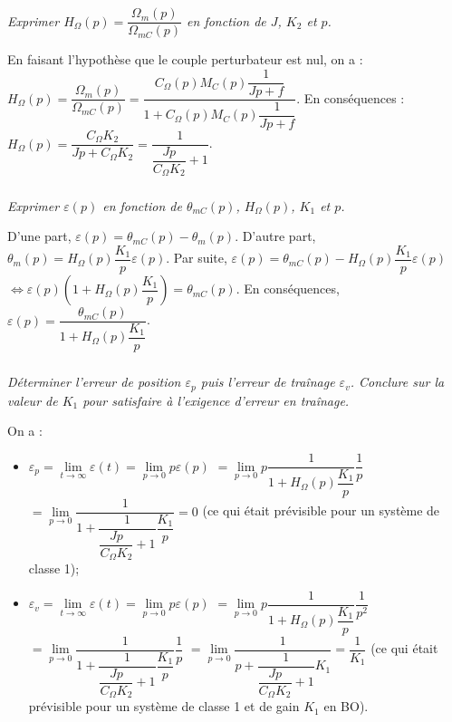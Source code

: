 \documentclass[10pt,fleqn]{article} %
\begin{document}
\begin{multicols}{2}
\else
\fi


\subparagraph{}\textit{Exprimer $H_{\Omega}(p)=\dfrac{\Omega_m(p)}{\Omega_{mC}(p)}$
en fonction de $J$, $K_2$ et $p$.}
\ifprof
\begin{corrige}
En faisant l'hypothèse que le couple perturbateur est nul, on a :
$H_{\Omega}(p)=\dfrac{\Omega_m(p)}{\Omega_{mC}(p)}=\dfrac{C_{\Omega}(p)M_C(p)\dfrac{1}{Jp+f}}{1+C_{\Omega}(p)M_C(p)\dfrac{1}{Jp+f}}$. En conséquences : 
$H_{\Omega}(p)=\dfrac{C_{\Omega} K_2}{Jp+C_{\Omega} K_2 } = \dfrac{1}{\dfrac{Jp}{C_{\Omega} K_2}+1 } $.

\end{corrige}
\else
\fi

\subparagraph{}\textit{Exprimer $\varepsilon(p)$ en fonction de $\theta_{mC}(p)$, $H_{\Omega}(p)$, $K_1$ et $p$.}
\ifprof

\begin{corrige}
D'une part, $\varepsilon(p)=\theta_{mC}(p)-\theta_{m}(p)$. D'autre part, 
$\theta_{m}(p) =H_{\Omega}(p) \dfrac{K_1}{p} \varepsilon(p)$. Par suite, 
$\varepsilon(p)=\theta_{mC}(p)-H_{\Omega}(p) \dfrac{K_1}{p}\varepsilon(p) $ 
$\Leftrightarrow \varepsilon(p)\left( 1+H_{\Omega}(p) \dfrac{K_1}{p}\right)= \theta_{mC}(p)$. 
En conséquences, $\varepsilon(p)=\dfrac{ \theta_{mC}(p)}{ 1+H_{\Omega}(p) \dfrac{K_1}{p}}$.
\end{corrige}
\else
\fi


\subparagraph{}\textit{Déterminer l’erreur de position $\varepsilon_p$ puis l’erreur de traînage $\varepsilon_v$. Conclure sur la valeur de $K_1$ pour satisfaire
à l’exigence d’erreur en traînage.}

\ifprof
\begin{corrige}
On a :
\begin{itemize}
\item $\varepsilon_p = \lim\limits_{t\to \infty} \varepsilon(t)= \lim\limits_{p\to 0} p\varepsilon(p) $ $= \lim\limits_{p\to 0} p \dfrac{ 1}{ 1+H_{\Omega}(p) \dfrac{K_1}{p}} \dfrac {1}{p}$
$= \lim\limits_{p\to 0} \dfrac{ 1}{ 1+\dfrac{1}{\dfrac{Jp}{C_{\Omega} K_2}+1 } \dfrac{K_1}{p}} = 0$ (ce qui était prévisible pour un système de classe 1);
\item $\varepsilon_v = \lim\limits_{t\to \infty} \varepsilon(t)= \lim\limits_{p\to 0} p\varepsilon(p) $ $= \lim\limits_{p\to 0} p \dfrac{ 1}{ 1+H_{\Omega}(p) \dfrac{K_1}{p}} \dfrac {1}{p^2}$
$= \lim\limits_{p\to 0} \dfrac{ 1}{ 1+\dfrac{1}{\dfrac{Jp}{C_{\Omega} K_2}+1 } \dfrac{K_1}{p}}\dfrac {1}{p} $
$= \lim\limits_{p\to 0} \dfrac{ 1}{ p+\dfrac{1}{\dfrac{Jp}{C_{\Omega} K_2}+1 } K_1}= \dfrac{1}{K_1}$ (ce qui était prévisible pour un système de classe 1 et de gain $K_1$ en BO).
\end{itemize}


\end{corrige}
\end{multicols}
\end{document}

